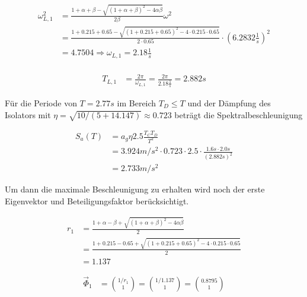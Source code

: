 \begin{align*}
\omega_{L,1}^2 &= \frac{1 + \alpha + \beta - \sqrt{(1 + \alpha + \beta)^2 - 4 \alpha \beta}}{2 \beta} \omega^2\\
               &= \frac{1 + 0.215 + 0.65 - \sqrt{(1 + 0.215 + 0.65)^2 - 4 \cdot 0.215 \cdot 0.65}}{2 \cdot 0.65} \cdot (6.2832 \frac{1}{s})^2\\
               &= 4.7504 \Rightarrow  \omega_{L,1} = 2.18 \frac{1}{s}\\
\end{align*}

\begin{align*}
T_{L,1} &= \frac{2 \pi}{\omega_{L,1}} = \frac{2 \pi}{2.18 \frac{1}{s}} = 2.882 s
\end{align*}

Für die Periode von $T = 2.77 s$ im Bereich $T_D \leq T$ und der Dämpfung des Isolators mit $\eta=\sqrt{10/(5+14.147)} \approx 0.723$ beträgt die Spektralbeschleunigung

\begin{align*}
S_a(T) &= a_g \eta 2.5 \frac{T_C T_D}{T^2}\\
       &= 3.924 m/s^2 \cdot 0.723 \cdot 2.5 \cdot \frac{1.6 s \cdot 2.0 s}{(2.882 s)^2}\\
       &= 2.733 m/s^2
\end{align*}

Um dann die maximale Beschleunigung zu erhalten wird noch der erste Eigenvektor und Beteiligungsfaktor berücksichtigt.

\begin{align*}
r_1 &= \frac{1 + \alpha - \beta + \sqrt{(1 + \alpha + \beta)^2 - 4 \alpha \beta}}{2} \\
    &= \frac{1 + 0.215 - 0.65 + \sqrt{(1 + 0.215 + 0.65)^2 - 4 \cdot 0.215 \cdot 0.65}}{2}\\
    &= 1.137
\end{align*}

\begin{align*}
\vec{\Phi}_1 &= \binom{1/r_1}{1} = \binom{1/1.137}{1} = \binom{0.8795}{1}
\end{align*}

